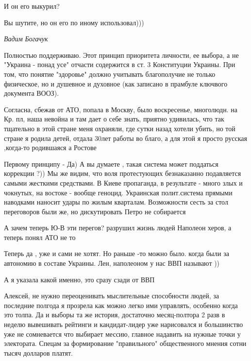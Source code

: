 \begin{itemize}
И он его выкурил?

Вы шутите, но он его по иному использовал)))

\emph{Вадим Богачук}

Полностью поддерживаю. Этот принцип приоритета личности, ее выбора, а не
"Украина - понад усе" отчасти содержится в ст. 3 Конституции Украины. При том,
что понятие "здоровье" должно учитывать благополучие не только физическое, но и
душевное и духовное (как записано в прамбуле ключвого документа ВООЗ).



Согласна, сбежав от АТО, попала в Москву, было воскресенье, многолюдн. на Кр. пл, наша
невойна и там дает о себе знать, приятно удивилась, что так тщательно в этой
стране меня охраняли, где сутки назад хотели убить, но той стране я родила
детей, отдала 30лет работы во благо, а для этой я просто русская ,когда-то
родившаяся а Ростове


Первому принципу - Да) А вы думаете , такая система может поддаться коррекции
?)) Мы же видим, что воля протестующих безнаказанно подавляется самыми жесткими
средствами. В Киеве пропаганда, в результате - много злых и чокнутых, на
востоке - вообще геноцид. Украинская полит.система прямыми наводками наносит
удары по жилым кварталам. Возможности сесть за стол переговоров были же, но
дискутировать Петро не собирается


А зачем теперь Ю-В эти перегов? разрушил жизнь людей Наполеон херов, а теперь
понял АТО не то


Теперь да , уже и сами не хотят. Но раньше -то можно было. когда были за
автономию в составе Украины. Лен, наполеоном у нас ВВП называют ))


А я указала какой именно, это сразу сзади от ВВП


Алексей, не нужно переоценивать мыслительные способности людей, за последние
полгода я прозрела как можно легко ими управлять, особенно когда это толпа. Да
и выборы та же история, достаточно месяц-полтора 2 разв в неделю вывешивать
рейтинги и кандидат-лидер уже нарисовался и большинство уже не сомневается что
выбирает мессию, главное надавить на нужные точки у электората. Спецам за
формирование "правильного" общественного мнения сотни тысяч долларов платят.


\end{itemize}
